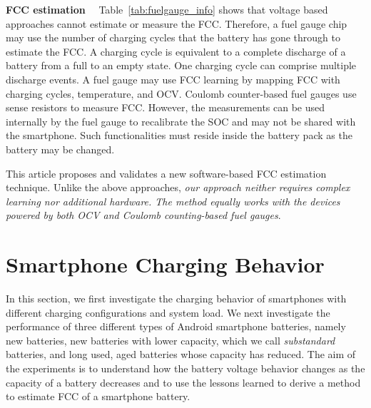 \documentclass[journal]{IEEEtran}
\begin{document}
\noindent\textbf{FCC estimation}~~ Table~\ref{tab:fuelgauge_info} shows that voltage based approaches cannot estimate or measure the FCC. Therefore, a fuel gauge chip may use the number of charging cycles that the battery has gone through to estimate the FCC. A charging cycle is equivalent to a complete discharge of a battery from a full to an empty state. One charging cycle can comprise multiple discharge events. A fuel gauge may use FCC learning by mapping FCC with charging cycles, temperature, and OCV.   Coulomb counter-based fuel gauges use sense resistors to measure FCC. However, the measurements can be used internally by the fuel gauge to recalibrate the SOC and may not be shared with the smartphone. Such functionalities must reside inside the battery pack as the battery may be changed.




This article proposes and validates a new software-based FCC estimation technique. Unlike the above approaches, \textit{our approach neither requires complex learning nor additional hardware. The method equally works with the devices powered by both OCV and Coulomb counting-based fuel gauges}.










 
















\section{Smartphone Charging Behavior}
\label{sec:three}




In this section, we first investigate the charging behavior of smartphones with different charging configurations and system load. We next investigate the performance of three different types of Android smartphone batteries, namely new batteries, new batteries with lower capacity, which we call \textit{substandard} batteries, and long used, aged batteries whose capacity has reduced. The aim of the experiments is to understand how the battery voltage behavior changes as the capacity of a battery decreases and to use the lessons learned to derive a method to estimate FCC of a smartphone battery. 
\end{document}
